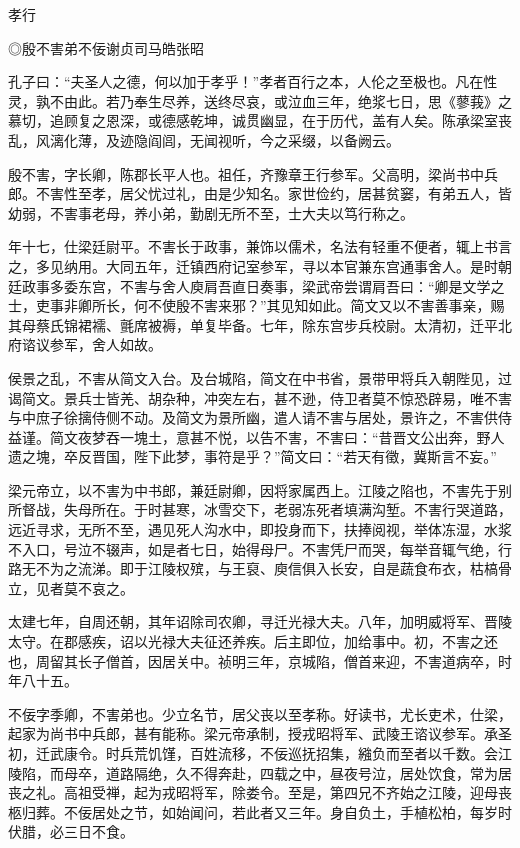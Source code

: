 \documentclass[]{article}
\begin{document}
孝行

◎殷不害弟不佞谢贞司马皓张昭

孔子曰：``夫圣人之德，何以加于孝乎！''孝者百行之本，人伦之至极也。凡在性灵，孰不由此。若乃奉生尽养，送终尽哀，或泣血三年，绝浆七日，思《蓼莪》之慕切，追顾复之恩深，或德感乾坤，诚贯幽显，在于历代，盖有人矣。陈承梁室丧乱，风漓化薄，及迹隐阎闾，无闻视听，今之采缀，以备阙云。

殷不害，字长卿，陈郡长平人也。祖任，齐豫章王行参军。父高明，梁尚书中兵郎。不害性至孝，居父忧过礼，由是少知名。家世俭约，居甚贫窭，有弟五人，皆幼弱，不害事老母，养小弟，勤剧无所不至，士大夫以笃行称之。

年十七，仕梁廷尉平。不害长于政事，兼饰以儒术，名法有轻重不便者，辄上书言之，多见纳用。大同五年，迁镇西府记室参军，寻以本官兼东宫通事舍人。是时朝廷政事多委东宫，不害与舍人庾肩吾直日奏事，梁武帝尝谓肩吾曰：``卿是文学之士，吏事非卿所长，何不使殷不害来邪？''其见知如此。简文又以不害善事亲，赐其母蔡氏锦裙襦、氈席被褥，单复毕备。七年，除东宫步兵校尉。太清初，迁平北府谘议参军，舍人如故。

侯景之乱，不害从简文入台。及台城陷，简文在中书省，景带甲将兵入朝陛见，过谒简文。景兵士皆羌、胡杂种，冲突左右，甚不逊，侍卫者莫不惊恐辟易，唯不害与中庶子徐摛侍侧不动。及简文为景所幽，遣人请不害与居处，景许之，不害供侍益谨。简文夜梦吞一塊土，意甚不悦，以告不害，不害曰：``昔晋文公出奔，野人遗之塊，卒反晋国，陛下此梦，事符是乎？''简文曰：``若天有徵，冀斯言不妄。''

梁元帝立，以不害为中书郎，兼廷尉卿，因将家属西上。江陵之陷也，不害先于别所督战，失母所在。于时甚寒，冰雪交下，老弱冻死者填满沟堑。不害行哭道路，远近寻求，无所不至，遇见死人沟水中，即投身而下，扶捧阅视，举体冻湿，水浆不入口，号泣不辍声，如是者七日，始得母尸。不害凭尸而哭，每举音辄气绝，行路无不为之流涕。即于江陵权殡，与王裒、庾信俱入长安，自是蔬食布衣，枯槁骨立，见者莫不哀之。

太建七年，自周还朝，其年诏除司农卿，寻迁光禄大夫。八年，加明威将军、晋陵太守。在郡感疾，诏以光禄大夫征还养疾。后主即位，加给事中。初，不害之还也，周留其长子僧首，因居关中。祯明三年，京城陷，僧首来迎，不害道病卒，时年八十五。

不佞字季卿，不害弟也。少立名节，居父丧以至孝称。好读书，尤长吏术，仕梁，起家为尚书中兵郎，甚有能称。梁元帝承制，授戎昭将军、武陵王谘议参军。承圣初，迁武康令。时兵荒饥馑，百姓流移，不佞巡抚招集，繈负而至者以千数。会江陵陷，而母卒，道路隔绝，久不得奔赴，四载之中，昼夜号泣，居处饮食，常为居丧之礼。高祖受禅，起为戎昭将军，除娄令。至是，第四兄不齐始之江陵，迎母丧柩归葬。不佞居处之节，如始闻问，若此者又三年。身自负土，手植松柏，每岁时伏腊，必三日不食。
\end{document}
